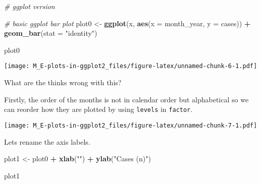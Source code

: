 \documentclass[]{article}
\newenvironment{Shaded}{\begin{snugshade}}{\end{snugshade}}
\newcommand{\CommentTok}[1]{\textcolor[rgb]{0.56,0.35,0.01}{\textit{#1}}}
\newcommand{\DataTypeTok}[1]{\textcolor[rgb]{0.13,0.29,0.53}{#1}}
\newcommand{\KeywordTok}[1]{\textcolor[rgb]{0.13,0.29,0.53}{\textbf{#1}}}
\newcommand{\NormalTok}[1]{#1}
\newcommand{\OperatorTok}[1]{\textcolor[rgb]{0.81,0.36,0.00}{\textbf{#1}}}
\newcommand{\OtherTok}[1]{\textcolor[rgb]{0.56,0.35,0.01}{#1}}
\newcommand{\StringTok}[1]{\textcolor[rgb]{0.31,0.60,0.02}{#1}}
\begin{document}
\begin{Shaded}
\begin{Highlighting}[]
\CommentTok{# ggplot version}

\CommentTok{# basic ggplot bar plot}
\NormalTok{plot0 <-}
\StringTok{  }\KeywordTok{ggplot}\NormalTok{(x, }\KeywordTok{aes}\NormalTok{(}\DataTypeTok{x =}\NormalTok{ month_year, }\DataTypeTok{y =}\NormalTok{ cases)) }\OperatorTok{+}
\StringTok{  }\KeywordTok{geom_bar}\NormalTok{(}\DataTypeTok{stat =} \StringTok{"identity"}\NormalTok{)}

\NormalTok{plot0}
\end{Highlighting}
\end{Shaded}

\texttt{[image: M\_E-plots-in-ggplot2\_files/figure-latex/unnamed-chunk-6-1.pdf]}

What are the thinks wrong with this?

Firstly, the order of the months is not in calendar order but
alphabetical so we can reorder how they are plotted by using
\texttt{levels} in \texttt{factor}.

\begin{Shaded}
\end{Shaded}

\texttt{[image: M\_E-plots-in-ggplot2\_files/figure-latex/unnamed-chunk-7-1.pdf]}

Lets rename the axis labels.

\begin{Shaded}
\begin{Highlighting}[]
\NormalTok{plot1 <-}
\StringTok{  }\NormalTok{plot0 }\OperatorTok{+}
\StringTok{  }\KeywordTok{xlab}\NormalTok{(}\StringTok{""}\NormalTok{) }\OperatorTok{+}
\StringTok{  }\KeywordTok{ylab}\NormalTok{(}\StringTok{"Cases (n)"}\NormalTok{)}

\NormalTok{plot1}
\end{Highlighting}
\end{Shaded}
\end{document}
